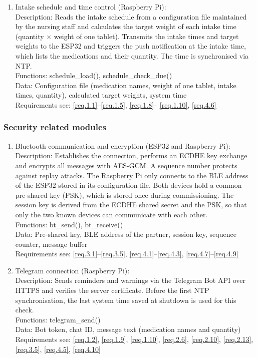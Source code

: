 \begin{enumerate}
		\item Intake schedule and time control (Raspberry Pi): \\
			Description: Reads the intake schedule from a configuration file
			maintained by the nursing staff and calculates the target weight
			of each intake time (quantity $\times$ weight of one tablet).
			Transmits the intake times and target weights to the ESP32 and
			triggers the push notification at the intake time, which lists the
			medications and their quantity. The time is synchronised via NTP. \\
			Functions: schedule\_load(), schedule\_check\_due() \\
			Data: Configuration file (medication names, weight of one tablet,
			intake times, quantity), calculated target weights, system time \\
			Requirements see: \ref{req.1.1}--\ref{req.1.5}, \ref{req.1.8}--
			\ref{req.1.10}, \ref{req.4.6}
	\end{enumerate}

\subsubsection{Security related modules}
	\begin{enumerate}
		\item Bluetooth communication and encryption (ESP32 and
		Raspberry Pi): \\
			Description: Establishes the connection, performs an ECDHE key
			exchange and encrypts all messages with AES-GCM. A sequence number
			protects against replay attacks. The Raspberry Pi only connects to
			the BLE address of the ESP32 stored in its configuration file.
			Both devices hold a common pre-shared key (PSK), which is stored
			once during commissioning. The session key is derived from the
			ECDHE shared secret and the PSK, so that only the two known devices
			can communicate with each other. \\
			Functions: bt\_send(), bt\_receive() \\
			Data: Pre-shared key, BLE address of the partner, session key,
			sequence counter, message buffer \\
			Requirements see: \ref{req.3.1}--\ref{req.3.5}, \ref{req.4.1}--\ref{req.4.3},
			\ref{req.4.7}--\ref{req.4.9}

		\item Telegram connection (Raspberry Pi): \\
			Description: Sends reminders and warnings via the Telegram Bot API
			over HTTPS and verifies the server certificate. Before the first NTP
			synchronisation, the last system time saved at shutdown is used for
			this check. \\
			Functions: telegram\_send() \\
			Data: Bot token, chat ID, message text (medication names and
			quantity) \\
			Requirements see: \ref{req.1.2}, \ref{req.1.9}, \ref{req.1.10}, \ref{req.2.6}, \ref{req.2.10}, \ref{req.2.13}, \ref{req.3.5}, \ref{req.4.5}, \ref{req.4.10}
	\end{enumerate}

